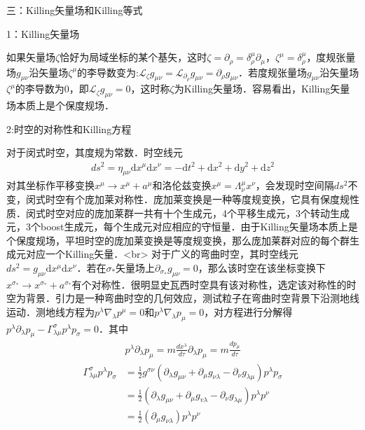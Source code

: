 三：Killing矢量场和Killing等式

1：Killing矢量场

如果矢量场$\zeta$恰好为局域坐标的某个基矢，这时$\zeta=\partial_{\rho}=\delta_{\rho}^{\mu} \partial_{\mu}$，$\zeta^{\mu}=\delta_{\rho}^{\mu}$，度规张量场$g_{\mu \nu}$沿矢量场$\zeta^{\mu}$的李导数变为:$\mathcal{L}_{\zeta} g_{\mu \nu} =\mathcal{L}_{\partial_{\rho}} g_{\mu \nu}=\partial_{\rho} g_{\mu \nu}$．若度规张量场$g_{\mu \nu}$沿矢量场$\zeta^{\mu}$的李导数为0，即$\mathcal{L}_{\zeta} g_{\mu \nu} =0$，这时称$\zeta$为Killing矢量场．容易看出，Killing矢量场本质上是个保度规场．

2:时空的对称性和Killing方程

对于闵式时空，其度规为常数．时空线元$$\begin{aligned}
d s^{2}=\eta_{\mu \nu} \mathrm{d} x^{\mu} \mathrm{d} x^{\nu}=-\mathrm{d} t^{2}+\mathrm{d} x^{2}+\mathrm{d} y^{2}+\mathrm{d} z^{2}
\end{aligned}$$对其坐标作平移变换$x^{\mu}\rightarrow x^{\mu}+a^{\mu}$和洛伦兹变换$x^{\mu}=\Lambda^{\mu}_{\nu} x^{\nu}$，会发现时空间隔$d s^{2}$不变，闵式时空有个庞加莱对称性．庞加莱变换是一种等度规变换，它具有保度规性质．闵式时空对应的庞加莱群一共有十个生成元，4个平移生成元，3个转动生成元，3个boost生成元，每个生成元对应相应的守恒量．由于Killing矢量场本质上是个保度规场，平坦时空的庞加莱变换是等度规变换，那么庞加莱群对应的每个群生成元对应一个Killing矢量．<br>
对于广义的弯曲时空，其时空线元$d s^{2}=g_{\mu \nu} \mathrm{d} x^{\mu} \mathrm{d} x^{\nu}$．若在$\sigma_{*}$矢量场上$\partial_{\sigma_{*}} g_{\mu \nu}=0$，那么该时空在该坐标变换下$x^{\sigma_{*}} \rightarrow x^{\sigma_{*}}+a^{\sigma_{*}}$有个对称性．很明显史瓦西时空具有该对称性，选定该对称性的时空为背景．引力是一种弯曲时空的几何效应，测试粒子在弯曲时空背景下沿测地线运动．测地线方程为$p^{\lambda} \nabla_{\lambda} p^{\mu}=0$和$p^{\lambda} \nabla_{\lambda} p_{\mu}=0$，对方程进行分解得$p^{\lambda} \partial_{\lambda} p_{\mu}-\Gamma_{\lambda \mu}^{\sigma} p^{\lambda} p_{\sigma}=0$．其中$$\begin{aligned}
p^{\lambda} \partial_{\lambda} p_{\mu}=m \frac{d x^{\lambda}}{d \tau} \partial_{\lambda} p_{\mu}=m \frac{d p_{\mu}}{d \tau}\end{aligned}$$
$$\begin{aligned}
\Gamma_{\lambda \mu}^{\sigma} p^{\lambda} p_{\sigma} &=\frac{1}{2} g^{\sigma \nu}\left(\partial_{\lambda} g_{\mu \nu}+\partial_{\mu} g_{\nu\lambda}-\partial_{\nu} g_{\lambda \mu}\right) p^{\lambda} p_{\sigma} \\
&=\frac{1}{2}\left(\partial_{\lambda} g_{\mu \nu}+\partial_{\mu} g_{v \lambda}-\partial_{\nu} g_{\lambda \mu}\right) p^{\lambda} p^{\nu} \\
&=\frac{1}{2}\left(\partial_{\mu} g_{\nu \lambda}\right) p^{\lambda} p^{\nu}
\end{aligned}$$
